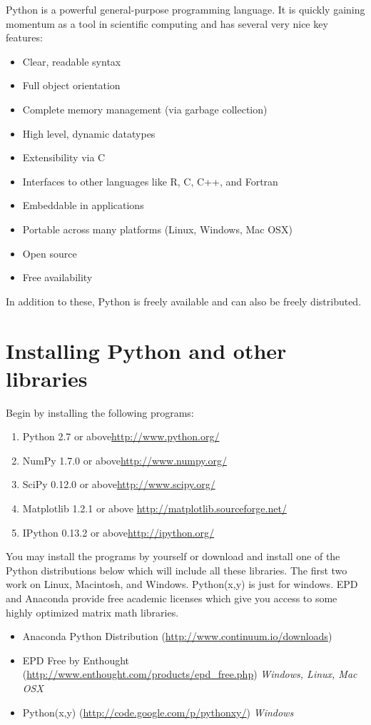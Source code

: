 \label{lab:Essential_Python}

Python is a powerful general-purpose programming language.
It is quickly gaining momentum as a tool in scientific computing and has several very
nice key features:
\begin{itemize}
\item Clear, readable syntax
\item Full object orientation
\item Complete memory management (via garbage collection)
\item High level, dynamic datatypes
\item Extensibility via C
\item Interfaces to other languages like R, C, C++, and Fortran
\item Embeddable in applications
\item Portable across many platforms (Linux, Windows, Mac OSX)
\item Open source
\item Free availability
\end{itemize}
In addition to these, Python is freely available and can also be freely distributed.

\section*{Installing Python and other libraries}
Begin by installing the following programs:
\begin{enumerate}
\item Python 2.7 or above\url{http://www.python.org/}
\item NumPy 1.7.0 or above\url{http://www.numpy.org/}
\item SciPy 0.12.0 or above\url{http://www.scipy.org/}
\item Matplotlib 1.2.1 or above \url{http://matplotlib.sourceforge.net/}
\item IPython 0.13.2 or above\url{http://ipython.org/}
\end{enumerate}
You may install the programs by yourself or download and install one of the Python
distributions below which will include all these libraries.
The first two work on Linux, Macintosh, and Windows.
Python(x,y) is just for windows.
EPD and Anaconda provide free academic licenses which give you access to some highly
optimized matrix math libraries.
\begin{itemize}
\item Anaconda Python Distribution (\url{http://www.continuum.io/downloads})
\item EPD Free by Enthought (\url{http://www.enthought.com/products/epd_free.php})
        \emph{Windows, Linux, Mac OSX}
\item Python(x,y) (\url{http://code.google.com/p/pythonxy/}) \emph{Windows}
\end{itemize}

